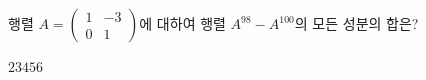 \hspace*{2mm}\begin{minipage}[t]{\dimexpr\linewidth-2mm\relax}\vspace{0pt}
행렬 $A=\begin{pmatrix} 1 & -3 \\ 0 & 1 \end{pmatrix}$에 대하여 행렬 $A^{98}-A^{100}$의 모든 성분의 합은?
\begin{choices32}{$2$}{$3$}{$4$}{$5$}{$6$}\end{choices32}\end{minipage}
